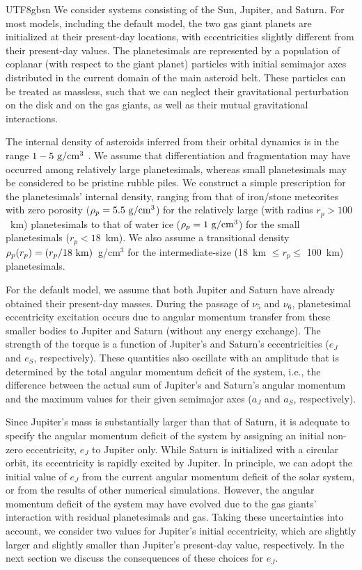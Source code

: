 \documentclass[tighten]{aastex6}
\begin{document}
\begin{CJK*}{UTF8}{gbsn}
We consider systems consisting of the Sun, Jupiter, and Saturn. For most
models, including the default model, the two gas giant planets are 
initialized at their present-day locations, with eccentricities slightly 
different from their present-day values. The 
planetesimals are represented by a population of coplanar (with 
respect to the giant planet) particles with initial semimajor 
axes distributed in the current domain of the main asteroid belt. 
These particles can be treated as massless, such that 
we can neglect their gravitational perturbation on the disk and on the gas 
giants, as well as their mutual gravitational interactions.  

The internal density of asteroids inferred from their orbital 
dynamics is in the range $1-5~\rm{g/cm^3}$ \citep{margot2002,
marchis2006, descamps2008}. We assume that differentiation and fragmentation 
may have occurred among relatively large planetesimals, whereas small
planetesimals may be considered to be pristine rubble piles.  We 
construct a simple prescription for the planetesimals' 
internal density, ranging from that of iron/stone meteorites with 
zero porosity ($\rho_{p} = 5.5~\rm{g/cm^3}$) for the relatively large 
(with radius $r_p > 100$~km) planetesimals to that of water ice 
($\rho_p = 1~\rm{g/cm^3}$) for the small planetesimals ($r_p < 18$~km).  We also 
assume a transitional density $\rho_p(r_p) = (r_p/18~{\rm km})$~g/cm$^3$ 
for the intermediate-size (18~km $ \le r_p \le$ 100~km) planetesimals.  


For the default model, we assume that both Jupiter and Saturn have 
already obtained their present-day masses. During the passage 
of $\nu_5$ and $\nu_6$, planetesimal eccentricity 
excitation occurs due to angular momentum transfer from these smaller 
bodies to Jupiter and Saturn (without any energy exchange). The 
strength of the torque is a function of Jupiter's and Saturn's 
eccentricities ($e_J$ and $e_S$, respectively).  These quantities also
oscillate with an amplitude that is determined by the total angular 
momentum deficit of the system, i.e., the difference between the actual 
sum of Jupiter's and Saturn's angular momentum and the maximum values
for their given semimajor axes ($a_J$ and $a_S$, respectively).  

Since Jupiter's mass is substantially larger than that of Saturn, 
it is adequate to specify the angular momentum deficit of the system by 
assigning an initial non-zero eccentricity, $e_{J}$ to Jupiter only. 
While Saturn is initialized with a circular orbit, its eccentricity
is rapidly excited by Jupiter.
In principle, we can adopt the initial value of $e_J$ from the current
angular momentum deficit of the solar system, or from the results of other
numerical simulations.  However, the angular momentum deficit of the 
system may have evolved due to the gas giants' interaction with residual
planetesimals and gas. Taking these uncertainties into account, we consider two values for Jupiter's initial eccentricity, which are slightly larger and slightly smaller than Jupiter's present-day value, respectively. In the next section we discuss the consequences of these choices for $e_J$.



\end{CJK*}
\end{document}
